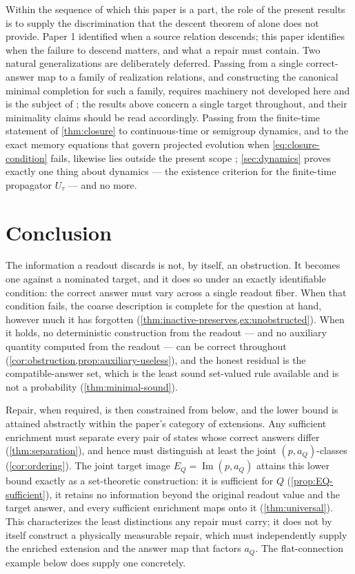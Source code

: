 \documentclass[11pt,reqno]{amsart}
\theoremstyle{plain}
\theoremstyle{definition}
\newcommand{\Img}{\operatorname{Im}}
\begin{document}
Within the sequence of which this paper is a part, the role of the present results is to supply
the discrimination that the descent theorem of \cite{ShadowI} alone does not provide. Paper 1
identified when a source relation descends; this paper identifies when the failure to descend
matters, and what a repair must contain. Two natural generalizations are deliberately deferred.
Passing from a single correct-answer map to a family of realization relations, and constructing the
canonical minimal completion for such a family, requires machinery not developed here and is the
subject of \cite{ShadowIII}; the results above concern a single target throughout, and their
minimality claims should be read accordingly. Passing from the finite-time statement of
\cref{thm:closure} to continuous-time or semigroup dynamics, and to the exact memory equations
that govern projected evolution when \eqref{eq:closure-condition} fails, likewise lies outside the
present scope \cite{ShadowV}; \cref{sec:dynamics} proves exactly one thing about dynamics --- the
existence criterion for the finite-time propagator $U_\tau$ --- and no more.

\section{Conclusion}\label{sec:conclusion}

The information a readout discards is not, by itself, an obstruction. It becomes one against a
nominated target, and it does so under an exactly identifiable condition: the correct answer must
vary across a single readout fiber. When that condition fails, the coarse description is complete
for the question at hand, however much it has forgotten
(\cref{thm:inactive-preserves,ex:unobstructed}). When it holds, no deterministic construction from
the readout --- and no auxiliary quantity computed from the readout --- can be correct throughout
(\cref{cor:obstruction,prop:auxiliary-useless}), and the honest residual is the compatible-answer
set, which is the least sound set-valued rule available and is not a probability
(\cref{thm:minimal-sound}).

Repair, when required, is then constrained from below, and the lower bound is attained
abstractly within the paper's category of extensions. Any sufficient enrichment must separate
every pair of states whose correct answers differ (\cref{thm:separation}), and hence must
distinguish at least the joint $(p,a_Q)$-classes (\cref{cor:ordering}). The joint target image
$E_Q=\Img(p,a_Q)$ attains this lower bound exactly as a set-theoretic construction: it is
sufficient for $Q$ (\cref{prop:EQ-sufficient}), it retains no information beyond the original
readout value and the target answer, and every sufficient enrichment maps onto it
(\cref{thm:universal}). This characterizes the least distinctions any repair must carry; it does
not by itself construct a physically measurable repair, which must independently supply the
enriched extension and the answer map that factors $a_Q$. The flat-connection example below does
supply one concretely.
\end{document}
